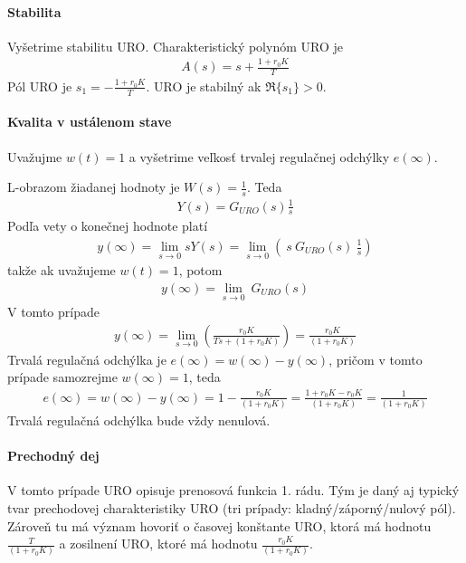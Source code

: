 \documentclass[a4paper, 10pt, ]{article}
\begin{document}
\paragraph{Stabilita}
Vyšetrime stabilitu URO. Charakteristický polynóm URO je
\begin{align}
    A(s) = s + \frac{1 + r_0 K}{T}
\end{align}
Pól URO je $s_1 = - \frac{1 + r_0 K}{T}$. URO je stabilný ak $\Re\{ s_1 \} > 0$.


\paragraph{Kvalita v ustálenom stave}
Uvažujme $w(t) = 1$ a vyšetrime veľkosť trvalej regulačnej odchýlky $e(\infty)$.

L-obrazom žiadanej hodnoty je $W(s) = \frac{1}{s}$. Teda
\begin{align}
    Y(s) = G_{URO}(s) \frac{1}{s}
\end{align}
Podľa vety o konečnej hodnote platí
\begin{align}
    y(\infty) = \lim_{s\to 0} s Y(s) = \lim_{s\to 0} \left( \ s \ G_{URO}(s) \ \frac{1}{s} \right)
\end{align}
takže ak uvažujeme $w(t) = 1$, potom
\begin{align}
    y(\infty) =  \lim_{s\to 0} \ G_{URO}(s)
\end{align}
V tomto prípade
\begin{align}
    y(\infty)
    =  \lim_{s\to 0} \left(  \frac{r_0 K}{Ts+ (1 + r_0 K)} \right)
    =  \frac{r_0 K}{(1 + r_0 K)}
\end{align}
Trvalá regulačná odchýlka je $e(\infty) = w(\infty) - y(\infty)$, pričom v tomto prípade samozrejme $ w(\infty) = 1$, teda
\begin{align}
    e(\infty)
    = w(\infty) - y(\infty)
    = 1 -  \frac{r_0 K}{(1 + r_0 K)}
    =\frac{1 + r_0 K - r_0 K}{(1 + r_0 K)}
    =\frac{1}{(1 + r_0 K)}
\end{align}
Trvalá regulačná odchýlka bude vždy nenulová.



\paragraph{Prechodný dej}
V tomto prípade URO opisuje prenosová funkcia 1. rádu. Tým je daný aj typický tvar prechodovej charakteristiky URO (tri prípady: kladný/záporný/nulový pól). Zároveň tu má význam hovoriť o časovej konštante URO, ktorá má hodnotu $\frac{T}{(1 + r_0 K)}$ a zosilnení URO, ktoré má hodnotu $\frac{r_0 K}{(1 + r_0 K)}$.
\end{document}
